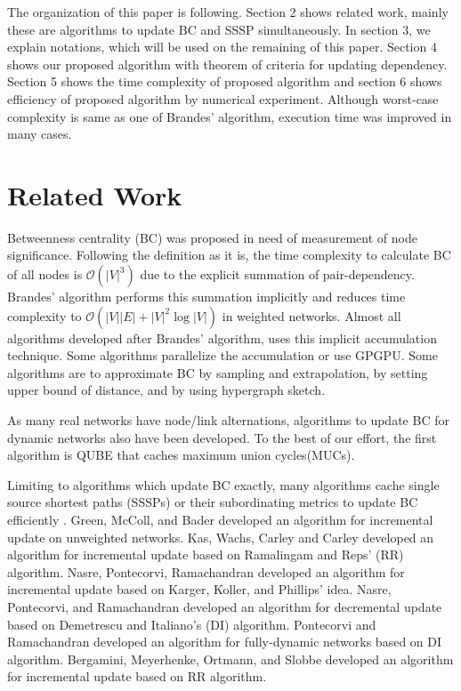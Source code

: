 \documentclass{article}
\begin{document}
The organization of this paper is following.
Section 2 shows related work, mainly these are algorithms to update BC and SSSP simultaneously.
In section 3, we explain notations, which will be used on the remaining of this paper.
Section 4 shows our proposed algorithm with theorem of criteria for updating dependency.
Section 5 shows the time complexity of proposed algorithm and section 6 shows efficiency of proposed algorithm by numerical experiment.
Although worst-case complexity is same as one of Brandes' algorithm, execution time was improved in many cases.

\section{Related Work}
Betweenness centrality (BC) was proposed in need of measurement of node significance\cite{Freeman1977}.
Following the definition as it is, the time complexity to calculate BC of all nodes is $\mathcal{O}(\lvert V\rvert^3)$ due to the explicit summation of pair-dependency.
Brandes' algorithm\cite{Brandes2001} performs this summation implicitly and reduces time complexity to $\mathcal{O}(\lvert V\rvert\lvert E\rvert+\lvert V\rvert^2\log\lvert V\rvert)$ in weighted networks.
Almost all algorithms developed after Brandes' algorithm, uses this implicit accumulation technique.
Some algorithms parallelize the accumulation\cite{Bader2006,Tan2009,Edmonds2010} or use GPGPU\cite{Shi2011,Sariyuce2013,Bernaschi2016}.
Some algorithms are to approximate BC by sampling and extrapolation\cite{Brandes2007,Bader2007,Geisberger2008,Chehreghani2014,Riondato2014,Riondato2016,Borassi2019},
by setting upper bound of distance\cite{Pfeffer2012}, and by using hypergraph sketch\cite{Yoshida2014}.

As many real networks have node/link alternations\cite{Holme2012}, algorithms to update BC for dynamic networks also have been developed.
To the best of our effort, the first algorithm is QUBE\cite{Lee2012} that caches maximum union cycles(MUCs).

Limiting to algorithms which update BC exactly, many algorithms cache single source shortest paths (SSSPs) or their subordinating metrics to update BC efficiently
\cite{Green2012,Kas2013,Nasre2014a,Nasre2014b,Pontecorvi2015,Bergamini2017}.
Green, McColl, and Bader\cite{Green2012} developed an algorithm for incremental update on unweighted networks.
Kas, Wachs, Carley and Carley\cite{Kas2013} developed an algorithm for incremental update based on Ramalingam and Reps' (RR) algorithm\cite{Ramalingam1996}.
Nasre, Pontecorvi, Ramachandran\cite{Nasre2014a} developed an algorithm for incremental update based on Karger, Koller, and Phillips' idea\cite{Karger1993}.
Nasre, Pontecorvi, and Ramachandran\cite{Nasre2014b} developed an algorithm for decremental update based on Demetrescu and Italiano's (DI) algorithm\cite{Demetrescu2003}.
Pontecorvi and Ramachandran\cite{Pontecorvi2014} developed an algorithm for fully-dynamic networks based on DI algorithm.
Bergamini, Meyerhenke, Ortmann, and Slobbe\cite{Bergamini2017} developed an algorithm for incremental update based on RR algorithm.
\end{document}
